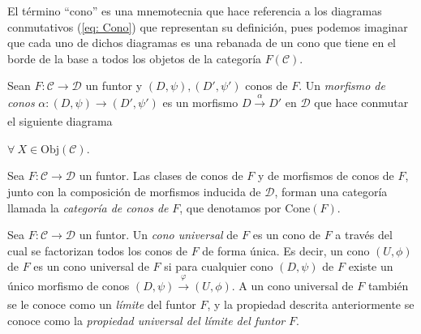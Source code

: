 \documentclass[tesis]{subfiles}
\begin{document}
\begin{Obs}\label{Obs: Cono}
    El término ``cono'' es una mnemotecnia que hace referencia a los diagramas conmutativos (\ref{eq: Cono}) que representan su definición, pues podemos imaginar que cada uno de dichos diagramas es una rebanada de un cono que tiene en el borde de la base a todos los objetos de la categoría $F(\mathscr{C})$.
\end{Obs}

\begin{Def}\label{Def: Morfismo de conos}
    Sean $F:\mathscr{C}\to \mathscr{D}$ un funtor y $(D,\psi), (D',\psi')$ conos de $F$. Un \emph{morfismo de conos} $\alpha:(D,\psi)\to (D',\psi')$ es un morfismo $D\xrightarrow[]{\alpha} D'$ en $\mathscr{D}$ que hace conmutar el siguiente diagrama
    \begin{center}
        $\forall \ X\in\text{Obj}(\mathscr{C})$.
    \end{center}
\end{Def}

\begin{Obs}\label{Obs: Morfismo de conos}
    Sea $F:\mathscr{C}\to \mathscr{D}$ un funtor. Las clases de conos de $F$ y de morfismos de conos de $F$, junto con la composición de morfismos inducida de $\mathscr{D}$, forman una categoría llamada la \emph{categoría de conos de} $F$, que denotamos por $\text{Cone}(F)$. %
\end{Obs}

\begin{Def} \label{Def: límite}
    Sea $F:\mathscr{C}\to \mathscr{D}$ un funtor. Un \emph{cono universal} de $F$ es un cono de $F$ a través del cual se factorizan todos los conos de $F$ de forma única. Es decir, un cono $(U,\phi)$ de $F$ es un cono universal de $F$ si para cualquier cono $(D,\psi)$ de $F$ existe un único morfismo de conos $(D,\psi)\xrightarrow[]{\varphi} (U,\phi)$. A un cono universal de $F$ también se le conoce como un \emph{límite} del funtor $F$, y la propiedad descrita anteriormente se conoce como la \emph{propiedad universal del límite del funtor} $F$.
\end{Def}
\end{document}
